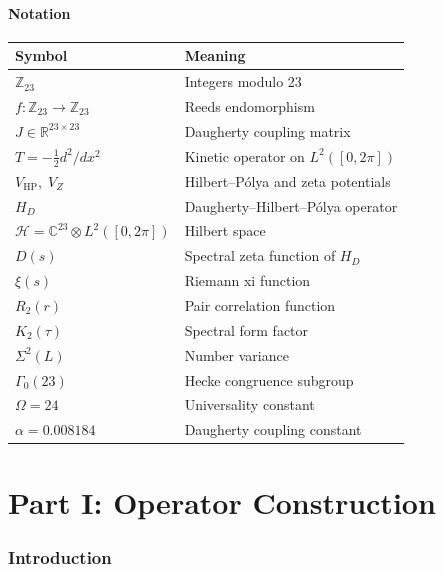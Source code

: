 \documentclass[11pt,a4paper]{article}
\theoremstyle{plain}
\theoremstyle{remark}
\newcommand{\Z}{\mathbb{Z}}
\newcommand{\C}{\mathbb{C}}
\newcommand{\R}{\mathbb{R}}
\newcommand{\HH}{\mathcal{H}}
\begin{document}
\tableofcontents
\newpage

\subsection*{Notation}

\begin{tabular}{@{}ll@{}}
\toprule
\textbf{Symbol} & \textbf{Meaning} \\
\midrule
$\Z_{23}$ & Integers modulo 23 \\
$f\colon\Z_{23}\to\Z_{23}$ & Reeds endomorphism \\
$J\in\R^{23\times 23}$ & Daugherty coupling matrix \\
$T=-\frac{1}{2}d^2/dx^2$ & Kinetic operator on $L^2([0,2\pi])$ \\
$V_{\mathrm{HP}},\; V_Z$ & Hilbert--P\'olya and zeta potentials \\
$H_D$ & Daugherty--Hilbert--P\'olya operator \\
$\HH=\C^{23}\otimes L^2([0,2\pi])$ & Hilbert space \\
$D(s)$ & Spectral zeta function of $H_D$ \\
$\xi(s)$ & Riemann xi function \\
$R_2(r)$ & Pair correlation function \\
$K_2(\tau)$ & Spectral form factor \\
$\Sigma^2(L)$ & Number variance \\
$\Gamma_0(23)$ & Hecke congruence subgroup \\
$\Omega=24$ & Universality constant \\
$\alpha=0.008184$ & Daugherty coupling constant \\
\bottomrule
\end{tabular}
\newpage


\part*{Part I: Operator Construction}

\section{Introduction}\label{sec:introduction}
\end{document}
